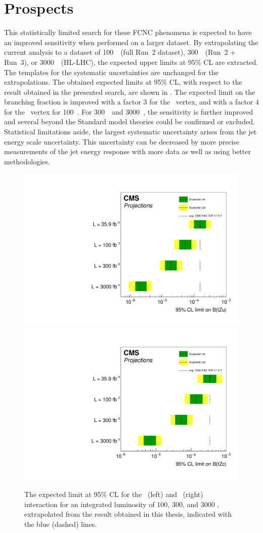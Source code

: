 \section{Prospects}
This statistically limited search for these FCNC phenomena is expected to have an improved sensitivity when performed on a larger dataset. By extrapolating the current analysis to a dataset of 100~\fbinv\ (full Run~2 dataset), 300~\fbinv\ (Run~2 + Run~3), or 3000~\fbinv\ (HL-LHC), the expected upper limits at 95\% CL are  extracted. %
The templates for the systematic uncertainties are unchanged for the extrapolations. The obtained expected limits at 95\% CL, with respect to the result obtained in the presented search, are shown in .  The expected limit on the branching fraction is improved with a factor  3 for the \Zut\ vertex, and with a factor  4 for the \Zct\ vertex for 100~\fbinv. For 300~\fbinv\ and 3000~\fbinv, the sensitivity is further improved and several beyond the Standard model theories could be confirmed or excluded. Statistical limitations aside, the largest systematic uncertainty arises from the jet energy scale uncertainty. This uncertainty can be decreased by more precise measurements of the jet energy response with more data as well as using better methodologies. %
\begin{figure}[htbp]
	\centering
	\includegraphics[width=0.49\linewidth]{7_Conclusion/Figures/TOP-17-017_limitsZutProj.pdf}
	\includegraphics[width=0.49\linewidth]{7_Conclusion/Figures/TOP-17-017_limitsZctproj.pdf}
	\caption{The expected limit at 95\% CL for the \Zut\ (left) and \Zct\ (right) interaction for an integrated luminosity of 100, 300, and 3000 \fbinv, extrapolated from the result obtained in this thesis, indicated with the blue (dashed) lines. }
	\label{fig:proj} %
\end{figure}



